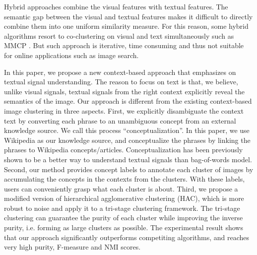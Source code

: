 Hybrid approaches combine the visual features
with textual features.
The semantic gap between the visual and textual features
makes it difficult to directly combine them into one uniform similarity measure.
For this reason, some hybrid algorithms resort to co-clustering on
visual and text simultaneously such as MMCP \cite{Fu2011}.
But such approach is iterative, time consuming and
thus not suitable for online applications such as image search.

In this paper, we propose a new context-based approach that
emphasizes on textual signal understanding.
The reason to focus on text is that, we believe, unlike visual signals,
textual signals from the right context explicitly reveal
the semantics of the image.
Our approach is different from the existing context-based image clustering
in three aspects. First, we explicitly disambiguate the context text
by converting each phrase to an unambiguous concept from an
external knowledge source. We call this process ``conceptualization''.
In this paper, we use
Wikipedia \cite{wikipedia} as our knowledge source,
and conceptualize the phrases by linking the phrases to
Wikipedia concepts/articles. Conceptualization has been previously shown
to be a better way to understand
textual signals than bag-of-words model.\cite{Song11:Conceptualize}
Second, our method provides concept labels to annotate
each cluster of images by accumulating the concepts in the contexts
from the clusters.
With these labels, users can conveniently grasp what each
cluster is about. Third, we propose a modified version of
hierarchical agglomerative clustering (HAC), which is more robust to noise
and apply it to a tri-stage clustering framework.
The tri-stage clustering can guarantee the purity of each cluster while
improving the inverse purity, i.e. forming as large clusters as possible.
The experimental result shows that our approach significantly outperforms
competiting algorithms, and reaches very high purity, F-measure and
NMI scores.

